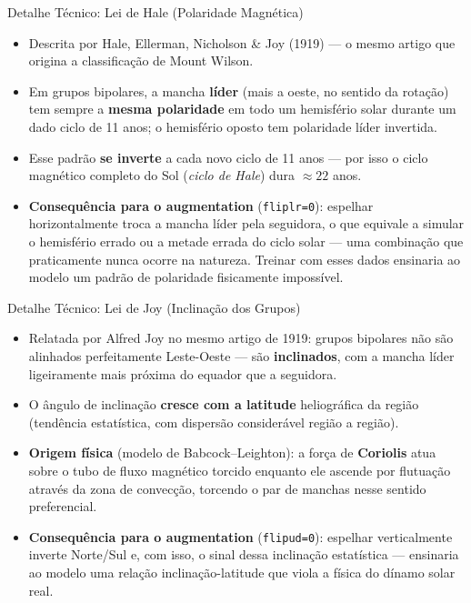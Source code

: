 \documentclass[aspectratio=169]{beamer}
\begin{document}
\begin{frame}{Detalhe Técnico: Lei de Hale (Polaridade Magnética)}
  \begin{itemize}
    \item Descrita por Hale, Ellerman, Nicholson \& Joy (1919) — o mesmo artigo que origina a classificação de Mount Wilson.
    \item Em grupos bipolares, a mancha \textbf{líder} (mais a oeste, no sentido da rotação) tem sempre a \textbf{mesma polaridade} em todo um hemisfério solar durante um dado ciclo de 11 anos; o hemisfério oposto tem polaridade líder invertida.
    \item Esse padrão \textbf{se inverte} a cada novo ciclo de 11 anos — por isso o ciclo magnético completo do Sol (\emph{ciclo de Hale}) dura $\approx 22$ anos.
    \item \textbf{Consequência para o augmentation} (\texttt{fliplr=0}): espelhar horizontalmente troca a mancha líder pela seguidora, o que equivale a simular o hemisfério errado ou a metade errada do ciclo solar — uma combinação que praticamente nunca ocorre na natureza. Treinar com esses dados ensinaria ao modelo um padrão de polaridade fisicamente impossível.
  \end{itemize}
\end{frame}

\begin{frame}{Detalhe Técnico: Lei de Joy (Inclinação dos Grupos)}
  \begin{itemize}
    \item Relatada por Alfred Joy no mesmo artigo de 1919: grupos bipolares não são alinhados perfeitamente Leste-Oeste — são \textbf{inclinados}, com a mancha líder ligeiramente mais próxima do equador que a seguidora.
    \item O ângulo de inclinação \textbf{cresce com a latitude} heliográfica da região (tendência estatística, com dispersão considerável região a região).
    \item \textbf{Origem física} (modelo de Babcock--Leighton): a força de \textbf{Coriolis} atua sobre o tubo de fluxo magnético torcido enquanto ele ascende por flutuação através da zona de convecção, torcendo o par de manchas nesse sentido preferencial.
    \item \textbf{Consequência para o augmentation} (\texttt{flipud=0}): espelhar verticalmente inverte Norte/Sul e, com isso, o sinal dessa inclinação estatística — ensinaria ao modelo uma relação inclinação-latitude que viola a física do dínamo solar real.
  \end{itemize}
\end{frame}
\end{document}
